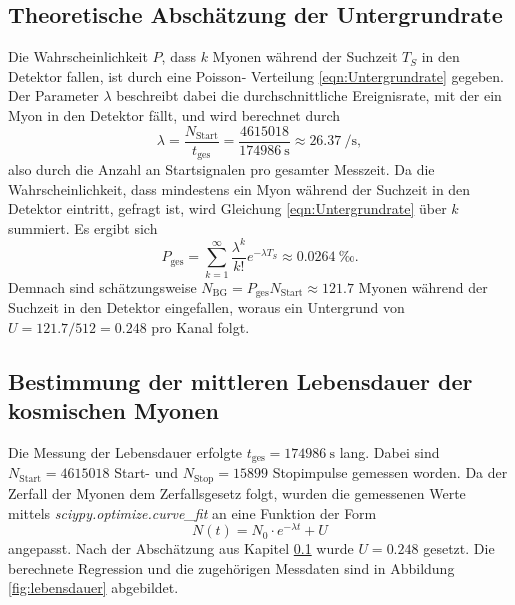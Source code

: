 \subsection{Theoretische Abschätzung der Untergrundrate}
\label{sec:untergrund}
Die Wahrscheinlichkeit $P$, dass $k$ Myonen während der Suchzeit $T_S$ in den Detektor fallen, ist durch eine Poisson- Verteilung \ref{eqn:Untergrundrate}
gegeben. Der Parameter $\lambda$ beschreibt dabei die durchschnittliche Ereignisrate, mit der ein Myon in den Detektor fällt, und wird berechnet durch
\begin{equation*}
  \lambda=\frac{N_\text{Start}}{t_\text{ges}}=\frac{\num{4615018}}{\SI{174986}{\second}}\approx \SI{26.37}{\per\second},
\end{equation*}
also durch die Anzahl an Startsignalen pro gesamter Messzeit. Da die Wahrscheinlichkeit, dass mindestens ein Myon während der Suchzeit in den Detektor eintritt,
gefragt ist, wird Gleichung \ref{eqn:Untergrundrate} über $k$ summiert. Es ergibt sich
\begin{equation*}
  P_{\text{ges}}=\sum_{k=1}^\infty\frac{\lambda^k}{k!}e^{-\lambda T_S}\approx\SI{0.0264}{‰}.
\end{equation*}
Demnach sind schätzungsweise $N_{\text{BG}}=P_{\text{ges}}N_{\text{Start}}\approx\num{121.7}$ Myonen während der Suchzeit in den Detektor eingefallen, woraus ein Untergrund
von $U=121.7/512=0.248$ pro Kanal folgt.

\subsection{Bestimmung der mittleren Lebensdauer der kosmischen Myonen}
\label{sec:lebensdauer}
Die Messung der Lebensdauer erfolgte $t_\text{ges}=\SI{174986}{\second}$ lang. Dabei sind $N_\text{Start}=\num{4615018}$ Start- und  $N_\text{Stop}=\num{15899}$
Stopimpulse gemessen worden. 
\noindent
Da der Zerfall der Myonen dem Zerfallsgesetz folgt, wurden die gemessenen Werte mittels \textit{sciypy.optimize.curve\_fit} an eine Funktion der Form 
\begin{equation}
  N(t)=N_0\cdot e^{-\lambda t}+U \label{eqn:expo}
\end{equation}
angepasst. Nach der Abschätzung aus Kapitel \ref{sec:untergrund} wurde $U=0.248$ gesetzt. Die berechnete Regression und die zugehörigen Messdaten sind in Abbildung 
\ref{fig:lebensdauer} abgebildet.

